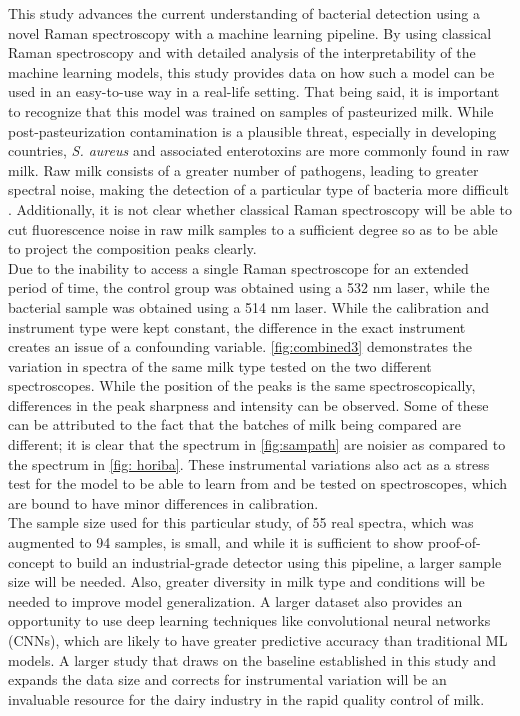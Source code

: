 This study advances the current understanding of bacterial detection using a novel Raman spectroscopy with a machine learning pipeline. By using classical Raman spectroscopy and with detailed analysis of the interpretability of the machine learning models, this study provides data on how such a model can be used in an easy-to-use way in a real-life setting. That being said, it is important to recognize that this model was trained on samples of pasteurized milk. While post-pasteurization contamination is a plausible threat, especially in developing countries, \textit{S. aureus} and associated enterotoxins are more commonly found in raw milk. Raw milk consists of a greater number of pathogens, leading to greater spectral noise, making the detection of a particular type of bacteria more difficult \cite{Quigley2013_JDS4928}. Additionally, it is not clear whether classical Raman spectroscopy will be able to cut fluorescence noise in raw milk samples to a sufficient degree so as to be able to project the composition peaks clearly. \\

\noindent Due to the inability to access a single Raman spectroscope for an extended period of time, the control group was obtained using a 532 nm laser, while the bacterial sample was obtained using a 514 nm laser. While the calibration and instrument type were kept constant, the difference in the exact instrument creates an issue of a confounding variable. \autoref{fig:combined3} demonstrates the variation in spectra of the same milk type tested on the two different spectroscopes. While the position of the peaks is the same spectroscopically, differences in the peak sharpness and intensity can be observed. Some of these can be attributed to the fact that the batches of milk being compared are different; it is clear that the spectrum in \autoref{fig:sampath} are noisier as compared to the spectrum in \autoref{fig: horiba}. These instrumental variations also act as a stress test for the model to be able to learn from and be tested on spectroscopes, which are bound to have minor differences in calibration. \\

\noindent The sample size used for this particular study, of 55 real spectra, which was augmented to 94 samples, is small, and while it is sufficient to show proof-of-concept to build an industrial-grade detector using this pipeline, a larger sample size will be needed. Also, greater diversity in milk type and conditions will be needed to improve model generalization. A larger dataset also provides an opportunity to use deep learning techniques like convolutional neural networks (CNNs), which are likely to have greater predictive accuracy than traditional ML models. A larger study that draws on the baseline established in this study and expands the data size and corrects for instrumental variation will be an invaluable resource for the dairy industry in the rapid quality control of milk. 

